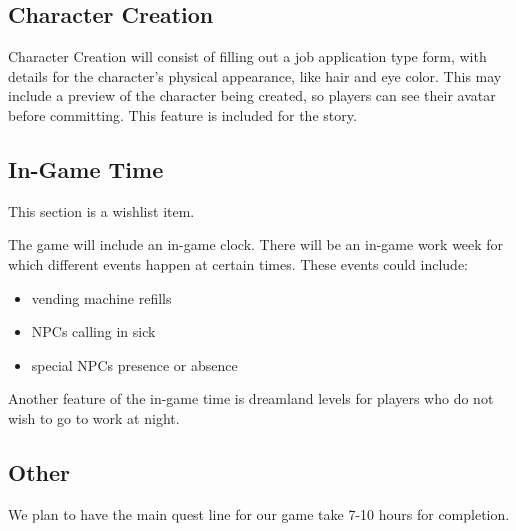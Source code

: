 \documentclass[14pt]{article}
\begin{document}
\subsection*{Character Creation}
Character Creation will consist of filling out a job application type form, 
with details for the character's physical appearance, like hair and eye color. 
This may include a preview of the character being created, so players can see
their avatar before committing. This feature is included for the story. 

\subsection*{In-Game Time}
This section is a wishlist item. 

The game will include an in-game clock. There will be an in-game work week
for which different events happen at certain times. These events could include:
\begin{itemize}
\item vending machine refills
\item NPCs calling in sick 
\item special NPCs presence or absence
\end{itemize}

Another feature of the in-game time is dreamland levels for players who
do not wish to go to work at night. 

\subsection*{Other}
We plan to have the main quest line for our game take 7-10 hours for completion.
\end{document}
